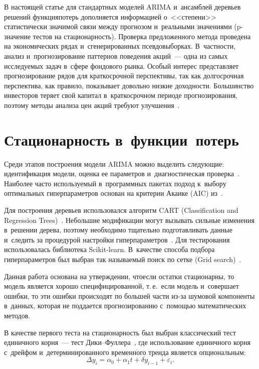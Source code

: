 \begin{multicols}{2}
В настоящей статье для стандартных моделей ARIMA и~ансамблей деревьев решений  
функция\linebreak потерь дополняется информацией о~<<степени>> статистически значимой связи между
 прогнозом и~реальными значениями (p-зна\-че\-ние тес\-тов на ста\-ци\-о\-нар\-ность). 
 Проверка предложенного метода \mbox{проведена} на экономических рядах и~сгенерированных псевдовыборках. 
 В~част\-ности, анализ и~прогнозирование паттернов поведения акций~--- одна из самых исследуемых задач 
 в~сфере фондового рынка. Особый интерес представляет прогнозирование рядов для краткосрочной
  перспективы, так как долгосрочная перспектива, как правило, показывает довольно низкие
   доходности. Большинство инвесторов теряет свой капитал в~краткосрочном периоде прогнозирования, 
   поэтому методы анализа цен акций требуют улучшения~\cite{15-kr}.


\vspace*{-6pt}


\section{Стационарность в~функции~потерь}

 Среди этапов построения модели ARIMA можно выделить 
 сле\-ду\-ющие: идентификация модели, оценка ее параметров и~диагностическая проверка~\cite{16-kr}. 
 Наиболее часто используемый в~про\-грам\-мных пакетах подход к~выбору оптимальных гиперпараметров 
 основан на критерии Акаике (AIC) из~\cite{17-kr}.

Для построения деревьев использовался алгоритм CART (Classification and Regression Trees)~\cite{18-kr}. 
Небольшие модификации могут вызывать сильные изменения в~решении дерева, поэтому необходимо 
тщательно подготавливать данные и~следить за процедурой настройки гиперпараметров~\cite{19-kr}. 
Для тестирования использовалась библиотека Scikit-learn. 
В~качестве способа подбора гиперпараметров был выбран так называемый поиск по сетке (Grid search)~\cite{18-kr}.

Данная работа основана на утверждении, что\linebreak если остатки стационарны, то модель является хорошо 
специфицированной, т.\,е.\ если модель и~совершает ошибки, то эти ошибки происходят 
по большей части из-за шумовой компоненты в~данных, которая не поддается прогнозированию с~по\-мощью 
математических методов.

В качестве первого теста на стационарность был выбран классический тест единичного корня~--- 
тест Ди\-ки--Фул\-ле\-ра~\cite{21-kr}, где использование единичного корня с~дрейфом и~детерминированного 
временн$\acute{\mbox{о}}$го тренда является опциональным:
\begin{equation*}
\Delta y_i = \alpha_0 + \alpha_1  t+\delta y_{i-1}+\varepsilon_i.
\end{equation*}



\end{multicols}
